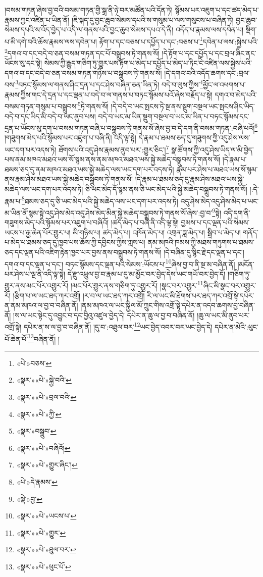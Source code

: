 །བསམ་གཏན་ཞེས་བྱ་བའི་བསམ་གཏན་གྱི་སྒྲ་ནི་ཉེ་བར་མཚོན་པའི་དོན་ཏེ། སྙོམས་པར་འཇུག་པ་དང་ཚད་མེད་པ་རྣམས་ཀྱང་འཛིན་པ་ཡིན་ནོ། །ཇི་སྐད་དུ་བྱང་ཆུབ་སེམས་དཔའི་ས་གསུམ་པ་ལས་གསུངས་པ་བཞིན་ཏེ། བྱང་ཆུབ་སེམས་དཔའི་ས་འོད་བྱེད་པ་འདི་ལ་གནས་པའི་བྱང་ཆུབ་སེམས་དཔའ་དེ་ནི། འདོད་པ་རྣམས་ལས་དབེན་པ། སྡིག་པ་མི་དགེ་བའི་ཆོས་རྣམས་ལས་དབེན་པ། རྟོག་པ་དང་བཅས་པ་དཔྱོད་པ་དང་:བཅས་པ་\footnote{«པེ་»བཅས་}དབེན་པ་ལས་:སྐྱེས་པའི་\footnote{«སྣར་»«པེ་»སྐྱེ་བའི་}དགའ་བ་དང་བདེ་བ་ཅན་བསམ་གཏན་དང་པོ་བསྒྲུབས་ཏེ་གནས་སོ། །དེ་རྟོག་པ་དང་དཔྱོད་པ་དང་བྲལ་ཞིང་ནང་ཡོངས་སུ་དང་སྟེ། སེམས་ཀྱི་རྒྱུད་གཅིག་ཏུ་གྱུར་པས་རྟོག་པ་མེད་པ་དཔྱོད་པ་མེད་པ་ཏིང་ངེ་འཛིན་ལས་སྐྱེས་པའི་དགའ་བ་དང་བདེ་བ་ཅན་བསམ་གཏན་གཉིས་པ་བསྒྲུབས་ཏེ་གནས་སོ། །དེ་དགའ་བའི་འདོད་ཆགས་དང་:བྲལ་བས་\footnote{«སྣར་»«པེ་»བྲལ་བའི་}བཏང་སྙོམས་ལ་གནས་ཤིང་དྲན་པ་དང་ཤེས་བཞིན་ཅན་ཡིན་ཏེ། བདེ་བ་ལུས་ཀྱིས་\footnote{«སྣར་»«པེ་»ཀྱི་}མྱོང་ལ་འཕགས་པ་རྣམས་ཀྱིས་གང་དེ་དྲན་པ་དང་ལྡན་པ་བདེ་བ་ལ་གནས་པ་བཏང་སྙོམས་པའོ་ཞེས་བརྗོད་པ་སྟེ། དགའ་བ་མེད་པའི་བསམ་གཏན་གསུམ་པ་བསྒྲུབས་\footnote{«སྣར་»བསྒྲུབ་}ཏེ་གནས་སོ། །དེ་བདེ་བ་ཡང་སྤངས་ཏེ་སྔ་ནས་སྡུག་བསྔལ་ཡང་སྤངས་ཤིང་ཡིད་བདེ་བ་དང་ཡིད་མི་བདེ་བ་ཡང་ནུབ་པས། བདེ་བ་ཡང་མ་ཡིན་སྡུག་བསྔལ་བ་ཡང་མ་ཡིན་པ་བཏང་སྙོམས་དང་དྲན་པ་ཡོངས་སུ་དག་པ་བསམ་གཏན་བཞི་པ་བསྒྲུབས་ཏེ་གནས་སོ་ཞེས་བྱ་བ་དེ་དག་ནི་བསམ་གཏན་:བཞི་པའོ།\footnote{«སྣར་»«པེ་»བཞིའོ།} །གཟུགས་མེད་པའི་སྙོམས་པར་འཇུག་པ་བཞི་ནི། འདི་ལྟ་སྟེ། དེ་རྣམ་པ་ཐམས་ཅད་དུ་གཟུགས་ཀྱི་འདུ་ཤེས་ལས་ཡང་དག་པར་འདས་ཏེ། ཐོགས་པའི་འདུ་ཤེས་རྣམས་ནུབ་པར་:གྱུར་ཅིང་།\footnote{«སྣར་»«པེ་»གྱུར་ཞིང་།} སྣ་ཚོགས་ཀྱི་འདུ་ཤེས་ཡིད་ལ་མི་བྱེད་པས་ནམ་མཁའ་མཐའ་ཡས་སོ་སྙམ་ནས་ནམ་མཁའ་མཐའ་ཡས་སྐྱེ་མཆེད་བསྒྲུབས་ཏེ་གནས་སོ། །དེ་རྣམ་པ་ཐམས་ཅད་དུ་ནམ་མཁའ་མཐའ་ཡས་སྐྱེ་མཆེད་ལས་ཡང་དག་པར་འདས་ཏེ། རྣམ་པར་ཤེས་པ་མཐའ་ཡས་སོ་སྙམ་ནས་རྣམ་ཤེས་མཐའ་ཡས་སྐྱེ་མཆེད་བསྒྲུབས་ཏེ་གནས་སོ། །དེ་རྣམ་པ་ཐམས་ཅད་དུ་རྣམ་ཤེས་མཐའ་ཡས་སྐྱེ་མཆེད་ལས་ཡང་དག་པར་འདས་ཏེ། ཅི་ཡང་མེད་དོ་སྙམ་ནས་ཅི་ཡང་མེད་པའི་སྐྱེ་མཆེད་བསྒྲུབས་ཏེ་གནས་སོ། །:དེ་རྣམ་པ་\footnote{«པེ་»དེ་རྣམས་}ཐམས་ཅད་དུ་ཅི་ཡང་མེད་པའི་སྐྱེ་མཆེད་ལས་ཡང་དག་པར་འདས་ཏེ། འདུ་ཤེས་མེད་འདུ་ཤེས་མེད་པ་ཡང་མ་ཡིན་ནོ་སྙམ་སྟེ་འདུ་ཤེས་མེད་འདུ་ཤེས་མེད་མིན་སྐྱེ་མཆེད་བསྒྲུབས་ཏེ་གནས་སོ་ཞེས་:བྱ་བ་\footnote{«སྡེ་»བྱ་}སྟེ། འདི་དག་ནི་གཟུགས་མེད་པའི་སྙོམས་པར་འཇུག་པ་བཞིའོ། །ཚད་མེད་པ་བཞི་ནི་འདི་ལྟ་སྟེ། བྱམས་པ་དང་ལྡན་པའི་སེམས་ཡངས་པ་རྒྱ་ཆེན་པོར་གྱུར་པ། མི་གཉིས་པ། ཚད་མེད་པ། འཁོན་མེད་པ། འགྲན་ཟླ་མེད་པ། སྒྲིབ་པ་མེད་པ། གནོད་པ་མེད་པ་ཐམས་ཅད་དུ་ཁྱབ་པས་ཆོས་ཀྱི་དབྱིངས་ཀྱིས་ཀླས་པ། ནམ་མཁའི་ཁམས་ཀྱི་མཐས་གཏུགས་པ་ཐམས་ཅད་དང་ལྡན་པའི་འཇིག་རྟེན་ཁྱབ་པར་བྱས་ནས་བསྒྲུབས་ཏེ་གནས་སོ། །དེ་བཞིན་དུ་སྙིང་རྗེ་དང་ལྡན་པ་དང་། དགའ་བ་དང་ལྡན་པ་དང་། བཏང་སྙོམས་དང་ལྡན་པའི་སེམས་:ཡོངས་པ་\footnote{«སྣར་»«པེ་»ཡངས་པ་}ཞེས་བྱ་བ་ནི་སྔ་མ་བཞིན་ནོ། །མངོན་པར་ཤེས་པ་ལྔ་ནི་འདི་ལྟ་སྟེ། དེ་རྫུ་འཕྲུལ་བྱ་བ་རྣམ་པ་དུ་མ་མྱོང་བར་བྱེད་དེས་ཡང་གཡོ་བར་བྱེད་དོ། །གཅིག་ཏུ་གྱུར་ནས་མང་པོར་འགྱུར་རོ། །མང་པོར་གྱུར་ནས་གཅིག་ཏུ་འགྱུར་རོ། །སྣང་བར་འགྱུར་\footnote{«སྣར་»«པེ་»གྱུར་}ཞིང་མི་སྣང་བར་འགྱུར་རོ། །རྩིག་པ་ལ་ཡང་ཐད་ཀར་འགྲོ། །ར་བ་ལ་ཡང་ཐད་ཀར་འགྲོ། རི་ལ་ཡང་མི་ཐོགས་པར་ཐད་ཀར་འགྲོ་སྟེ་དཔེར་ན་ནམ་མཁའ་ལ་བྱ་བ་བཞིན་ནོ། །ནམ་མཁའ་ལ་ཡང་སྐྱིལ་མོ་ཀྲུང་གིས་འགྲོ་སྟེ་དཔེར་ན་འདབ་ཆགས་བྱ་བཞིན་ནོ། །ས་ལ་ཡང་སྟེང་དུ་འབྱུང་བ་དང་བྱིའུ་འཛུལ་བྱེད་དེ། དཔེར་ན་ཆུ་ལ་བྱ་བ་བཞིན་ནོ། །ཆུ་ལ་ཡང་མི་ནུབ་པར་འགྲོ་སྟེ། དཔེར་ན་ས་ལ་བྱ་བ་བཞིན་ནོ། །དུ་བ་:འཐུལ་བར་\footnote{«སྣར་»«པེ་»ཐུལ་བར་}ཡང་བྱེད་འབར་བར་ཡང་བྱེད་དེ། དཔེར་ན་མེའི་:ཕུང་པོ་ཆེན་པོ་\footnote{«སྣར་»«པེ་»ཕུང་པོ་}བཞིན་ནོ། །
